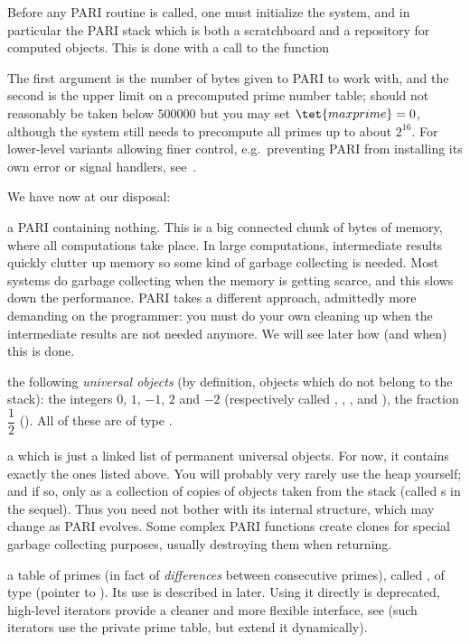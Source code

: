 Before any PARI routine is called, one must initialize the system, and in
particular the PARI stack which is both a scratchboard and a repository for
computed objects. This is done with a call to the function


\noindent The first argument is the number of bytes given to PARI to work
with, and the second is the upper limit on a precomputed prime number table;
 should not reasonably be taken below $500000$ but you may set
$\tet{maxprime} = 0$, although the system still needs to precompute all
primes up to about $2^{16}$. For lower-level variants allowing finer
control, e.g.~preventing PARI from installing its own error or signal
handlers, see~.

\noindent We have now at our disposal:

\item a PARI  containing nothing. This is a big
connected chunk of  bytes of memory, where all computations
take place. In large computations, intermediate results quickly
clutter up memory so some kind of garbage collecting is needed. Most
systems do garbage collecting when the memory is getting scarce, and this
slows down the performance. PARI takes a different approach, admittedly more
demanding on the programmer: you must do your own cleaning up when the
intermediate results are not needed anymore. We will see later how (and when)
this is done.

\item the following \emph{universal objects} (by definition, objects
which do not belong to the stack): the integers $0$, $1$, $-1$, $2$ and
$-2$ (respectively called , , ,
 and ), the fraction $\dfrac{1}{2}$ ().
All of these are of type .

\item a  which is just a linked list of permanent
universal objects. For now, it contains exactly the ones listed above. You
will probably very rarely use the heap yourself; and if so, only as a
collection of copies of objects taken from the stack (called s in
the sequel). Thus you need not bother with its internal structure, which may
change as PARI evolves. Some complex PARI functions create clones for special
garbage collecting purposes, usually destroying them when returning.

\item a table of primes (in fact of \emph{differences} between
consecutive primes), called , of type 
(pointer to ). Its use is described in
 later. Using it directly is deprecated,
high-level iterators provide a cleaner and more flexible interface, see
 (such iterators use the private prime table, but extend
it dynamically).


